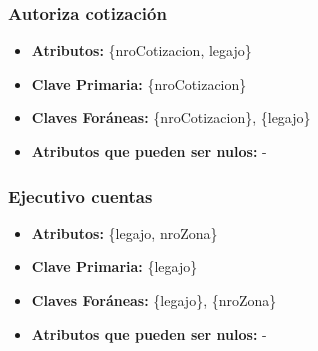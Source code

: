 \documentclass[a4paper,11pt]{article}
\begin{document}
\subsubsection{Autoriza cotización}

\begin{itemize}

	\item \textbf{Atributos:} \{nroCotizacion, legajo\}
	
	\item \textbf{Clave Primaria:} \{nroCotizacion\}
	
	\item \textbf{Claves Foráneas:} \{nroCotizacion\}, \{legajo\}
	
	\item \textbf{Atributos que pueden ser nulos:} -
	
\end{itemize}



	
	
	
	

\subsubsection{Ejecutivo cuentas}

\begin{itemize}

	\item \textbf{Atributos:} \{legajo, nroZona\}
	
	\item \textbf{Clave Primaria:} \{legajo\}
	
	\item \textbf{Claves Foráneas:} \{legajo\}, \{nroZona\}
	
	\item \textbf{Atributos que pueden ser nulos:} -
	
\end{itemize}
\end{document}
